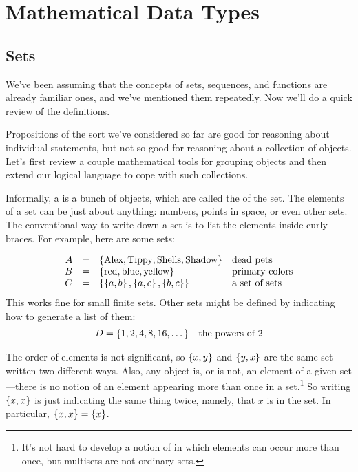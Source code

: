 \chapter{Mathematical Data Types}\label{sets_chap}

\newcommand{\inchrg}{\text{chrg}}
\newcommand{\facdom}{\text{Fac}}
\newcommand{\subnums}{\text{SubNums}}
\newcommand{\introsub}{\text{Intro}}


\section{Sets}
We've been assuming that the concepts of sets, sequences, and functions are
already familiar ones, and we've mentioned them repeatedly.  Now we'll do a
quick review of the definitions.

\begin{editingnotes}
Propositions of the sort we've considered so far are good for
reasoning about individual statements, but not so good for reasoning
about a collection of objects.  Let's first review a couple
mathematical tools for grouping objects and then extend our logical
language to cope with such collections.
\end{editingnotes}

Informally, a  is a bunch of objects, which are called the
 of the set.  The elements of a set can be just about
anything: numbers, points in space, or even other sets.  The conventional
way to write down a set is to list the elements inside curly-braces.  For
example, here are some sets:

\[
\begin{array}{rcll}
A & = & \left\{\text{Alex}, \text{Tippy}, \text{Shells}, \text{Shadow}\right\} & \text{dead pets} \\
B & = & \left\{\text{red}, \text{blue}, \text{yellow}\right\} & \text{primary colors} \\
C & = & \left\{ \left\{a, b\right\}, \left\{a, c\right\}, \left\{b, c\right\}\right\} & \text{a set of sets}
\end{array}
\]
This works fine for small finite sets.  Other sets might be defined by
indicating how to generate a list of them:
\begin{align*}
D & =  \left\{1,2,4,8,16,\dots\right\} & \text{the powers of 2}
\end{align*}

The order of elements is not significant, so $\left\{x, y\right\}$ and $\left\{y, x\right\}$
are the same set written two different ways.  Also, any object is, or is
not, an element of a given set ---there is no notion of an element
appearing more than once in a set.\footnote{It's not hard to develop a
notion of  in which elements can occur more than once, but
multisets are not ordinary sets.}  So writing $\left\{x,x\right\}$ is just
indicating the same thing twice, namely, that $x$ is in the set.  In
particular, $\left\{x,x\right\} = \left\{x\right\}$.

